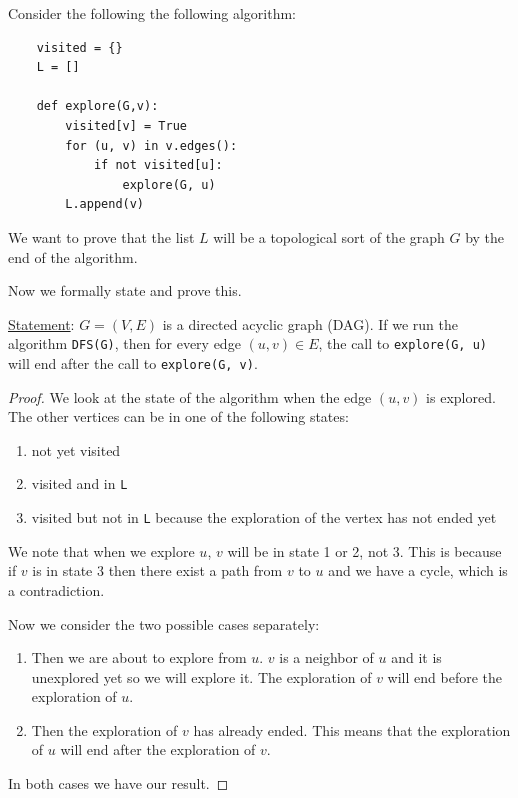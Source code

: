 \documentclass[10pt]{extarticle}
\begin{document}
Consider the following the following algorithm:

\begin{verbatim}
    visited = {}
    L = []

    def explore(G,v):
        visited[v] = True
        for (u, v) in v.edges():
            if not visited[u]:
                explore(G, u)
        L.append(v)
\end{verbatim}

We want to prove that the list $L$ will be a topological sort of the graph $G$ by the end of the algorithm.

Now we formally state and prove this.

\underline{Statement}: $G=(V, E)$ is a directed acyclic graph (DAG). If we run the algorithm \texttt{DFS(G)}, then for every edge $(u, v) \in E$, the call to \texttt{explore(G, u)} will end after the call to \texttt{explore(G, v)}.

\begin{proof}
    We look at the state of the algorithm when the edge $(u, v)$ is explored.
    The other vertices can be in one of the following states:
    \begin{enumerate}
        \item not yet visited
        \item visited and in \texttt{L}
        \item visited but not in \texttt{L} because the exploration of the vertex has not ended yet
    \end{enumerate}

    We note that when we explore $u$, $v$ will be in state 1 or 2, not 3.
    This is because if $v$ is in state 3 then there exist a path from $v$ to $u$ and we have a cycle, which is a contradiction.

    Now we consider the two possible cases separately:
    \begin{enumerate}
        \item Then we are about to explore from $u$. $v$ is a neighbor of $u$ and it is unexplored yet so we will explore it.
              The exploration of $v$ will end before the exploration of $u$.
        \item Then the exploration of $v$ has already ended. This means that the exploration of $u$ will end after the exploration of $v$.
    \end{enumerate}

    In both cases we have our result.
\end{proof}
\end{document}
